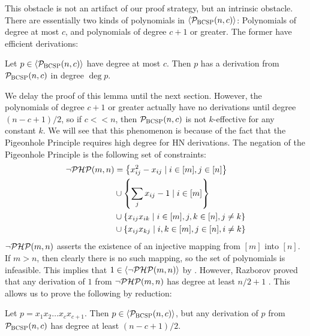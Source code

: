 This obstacle is not an artifact of our proof strategy, but an intrinsic obstacle. There are essentially two kinds of polynomials in $\langle \mathcal P_{\textsc{BCSP}}(n,c) \rangle$:
Polynomials of degree at most $c$, and polynomials of degree $c+1$ or greater. 
The former have efficient derivations:
\begin{lemma}\label{lem:bcsp-lowdeg}
Let $p \in \langle \mathcal P_{\textsc{BCSP}}(n,c) \rangle$ have degree at most $c$. Then $p$ has a derivation from $\mathcal P_{\textsc{BCSP}}(n,c)$ in degree $\deg p$.
\end{lemma}
We delay the proof of this lemma until the next section. 
However, the polynomials of degree $c+1$ or greater actually have no derivations until degree $(n-c+1)/2$, so if $c << n$, then $\mathcal P_{\textsc{BCSP}}(n,c)$ is not $k$-effective for any constant $k$.
We will see that this phenomenon is because of the fact that the Pigeonhole Principle requires high degree for HN derivations. 
The negation of the Pigeonhole Principle is the following set of constraints:
\begin{align*}
\neg\mathcal P\mathcal H\mathcal P(m,n) &= \left\{x_{ij}^2 - x_{ij} \mid i \in [m], j \in [n]\right\} \\
&\cup \left\{\sum_j x_{ij} - 1 \mid i \in [m]\right\} \\
&\cup \left\{x_{ij}x_{ik} \mid i \in [m], j,k \in [n], j \neq k\right\} \\
&\cup \left\{x_{ij}x_{kj} \mid i,k \in [m], j \in [n], i \neq k\right\}
\end{align*}
$\neg\mathcal P\mathcal H\mathcal P(m,n)$ asserts the existence of an injective mapping from $[m]$ into $[n]$. If $m > n$, then clearly there is no such mapping, so the set of polynomials is infeasible. This implies that $1 \in \langle \neg\mathcal P\mathcal H\mathcal P(m,n) \rangle$ by . However, Razborov proved that any derivation of $1$ from $\neg\mathcal P\mathcal H\mathcal P(m,n)$ has degree at least $n/2 + 1$ \cite{Raz98}.
This allows us to prove the following by reduction:
\begin{lemma}\label{lem:bcsp-highdeg-hard}
Let $p = x_1x_2\dots x_c x_{c+1}$. Then $p \in \langle \mathcal P_{\textsc{BCSP}}(n,c) \rangle$, but any derivation of $p$ from $\mathcal P_{\textsc{BCSP}}(n,c)$ has degree at least $(n-c+1)/2$. 
\end{lemma}

